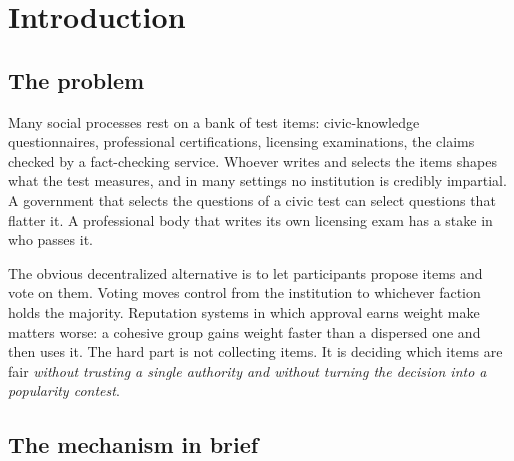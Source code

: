 \section{Introduction}\label{sec:intro}

\subsection{The problem}

Many social processes rest on a bank of test items: civic-knowledge questionnaires,
professional certifications, licensing examinations, the claims checked by a fact-checking
service. Whoever writes and selects the items shapes what the test measures, and in many
settings no institution is credibly impartial. A government that selects the questions of a
civic test can select questions that flatter it. A professional body that writes its own
licensing exam has a stake in who passes it.

The obvious decentralized alternative is to let participants propose items and vote on them.
Voting moves control from the institution to whichever faction holds the majority. Reputation
systems in which approval earns weight make matters worse: a cohesive group gains weight
faster than a dispersed one and then uses it. The hard part is not collecting items. It is
deciding which items are fair \emph{without trusting a single authority and without turning
the decision into a popularity contest}.

\subsection{The mechanism in brief}

